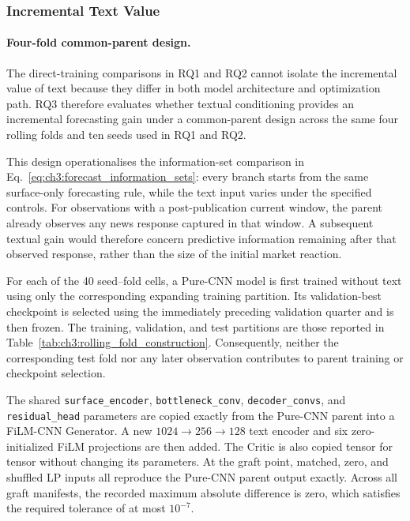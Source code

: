 \subsubsection*{Incremental Text Value}
\label{subsec:ch3:rq3_incremental_text_value}

\paragraph*{Four-fold common-parent design.}
The direct-training comparisons in RQ1 and RQ2 cannot isolate the incremental
value of text because they differ in both model architecture and optimization
path. RQ3 therefore evaluates whether textual conditioning provides an
incremental forecasting gain under a common-parent design across the same four
rolling folds and ten seeds used in RQ1 and RQ2.

This design operationalises the information-set comparison in
Eq.~\eqref{eq:ch3:forecast_information_sets}: every branch starts from the same
surface-only forecasting rule, while the text input varies under the specified
controls. For observations with a post-publication current window, the parent
already observes any news response captured in that window. A subsequent
textual gain would therefore concern predictive information remaining after
that observed response, rather than the size of the initial market reaction.

For each of the 40 seed--fold cells, a Pure-CNN model is first trained without
text using only the corresponding expanding training partition. Its
validation-best checkpoint is selected using the immediately preceding
validation quarter and is then frozen. The training, validation, and test
partitions are those reported in
Table~\ref{tab:ch3:rolling_fold_construction}. Consequently, neither the
corresponding test fold nor any later observation contributes to parent
training or checkpoint selection.

The shared \texttt{surface\_encoder}, \texttt{bottleneck\_conv},
\texttt{decoder\_convs}, and \texttt{residual\_head} parameters are copied
exactly from the Pure-CNN parent into a FiLM-CNN Generator. A new
$1024\rightarrow256\rightarrow128$ text encoder and six zero-initialized FiLM
projections are then added. The Critic is also copied tensor for tensor
without changing its parameters. At the graft point, matched, zero, and
shuffled LP inputs all reproduce the Pure-CNN parent output exactly. Across
all graft manifests, the recorded maximum absolute difference is zero, which
satisfies the required tolerance of at most $10^{-7}$.

